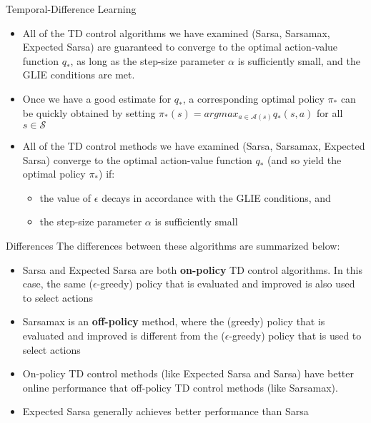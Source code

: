 \documentclass[10pt,mathserif]{beamer}
\begin{document}
\begin{frame}{Temporal-Difference Learning}
\begin{itemize}
\item All of the TD control algorithms we have examined (Sarsa, Sarsamax, Expected Sarsa) are guaranteed to converge
to the optimal action-value function $q_*$, as long as the step-size parameter $\alpha$ is sufficiently small, and the GLIE conditions are met.
\item Once we have a good estimate for $q_*$, a corresponding optimal policy $\pi_*$ can be quickly obtained by 
setting $\pi_*(s) = argmax_{a\in\mathcal{A}(s)}q_*(s,a)$ for all $s\in \mathcal{S}$
\item All of the TD control methods we have examined (Sarsa, Sarsamax, Expected Sarsa) converge to the optimal action-value function $q_*$ (and so yield the optimal policy $\pi_*$) if:
\begin{itemize}
\item the value of $\epsilon$ decays in accordance with the GLIE conditions, and
\item the step-size parameter $\alpha$ is sufficiently small
\end{itemize}
\end{itemize}
\end{frame}

\begin{frame}{Differences}
The differences between these algorithms are summarized below:
\begin{itemize}
\item Sarsa and Expected Sarsa are both \textbf{on-policy} TD control algorithms. In this case, the same ($\epsilon$-greedy) policy that is evaluated and improved is also used to select actions
\item Sarsamax is an \textbf{off-policy} method, where the (greedy) policy that is evaluated and improved is different from the ($\epsilon$-greedy) policy that is used to select actions
\item On-policy TD control methods (like Expected Sarsa and Sarsa) have better online performance that off-policy TD control methods (like Sarsamax).
\item Expected Sarsa generally achieves better performance than Sarsa
\end{itemize}
\end{frame}
\end{document}
